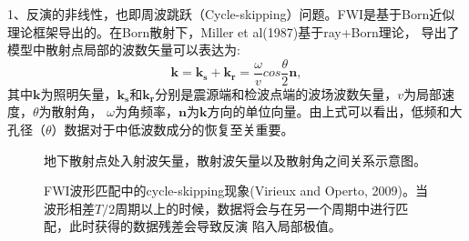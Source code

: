 1、反演的非线性，也即周波跳跃（Cycle-skipping）问题。FWI是基于Born近似理论框架导出的。在Born散射下，Miller et
al(1987)\cite{MillerEtAl1987}基于ray+Born理论，
导出了模型中散射点局部的波数矢量可以表达为:
\begin{equation}
    \mathbf{k}=\mathbf{k_s}+\mathbf{k_r}=\frac{\omega}{v}cos\frac{\theta}{2}\mathbf{n},
    \label{eq:Modelwnb}
\end{equation}
其中$\mathbf{k}$为照明矢量，$\mathbf{k_s}$和$\mathbf{k_r}$分别是震源端和检波点端的波场波数矢量，$v$为局部速度，$\theta$为散射角，
$\omega$为角频率，$\mathbf{n}$为$\mathbf{k}$方向的单位向量。由上式可以看出，低频和大孔径（$\theta$）数据对于中低波数成分的恢复至关重要。
\begin{figure}[!htb] 
   \centering 
   \caption{地下散射点处入射波矢量，散射波矢量以及散射角之间关系示意图。}
   \label{fig:WavenumberVector}
\end{figure}
\begin{figure}[!htb] 
   \centering 
   \caption{FWI波形匹配中的cycle-skipping现象(Virieux and Operto,
	   2009\cite{virieux2009overview})。当波形相差$T/2$周期以上的时候，数据将会与在另一个周期中进行匹配，此时获得的数据残差会导致反演
   陷入局部极值。}
   \label{fig:Cycleskipping}
\end{figure}
